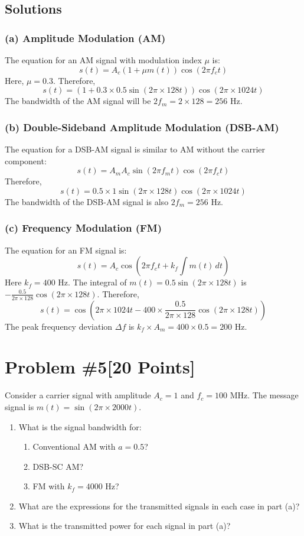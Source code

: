 \documentclass{article}
\begin{document}
\subsection*{Solutions}

\subsubsection*{(a) Amplitude Modulation (AM)}
The equation for an AM signal with modulation index \( \mu \) is:
\[
s(t) = A_c (1 + \mu m(t)) \cos(2\pi f_c t)
\]
Here, \( \mu = 0.3 \). Therefore,
\[
s(t) = (1 + 0.3 \times 0.5 \sin(2\pi \times 128 t)) \cos(2\pi \times 1024 t)
\]
The bandwidth of the AM signal will be \( 2f_m = 2 \times 128 = 256 \) Hz.

\subsubsection*{(b) Double-Sideband Amplitude Modulation (DSB-AM)}
The equation for a DSB-AM signal is similar to AM without the carrier component:
\[
s(t) = A_m A_c \sin(2\pi f_m t) \cos(2\pi f_c t)
\]
Therefore,
\[
s(t) = 0.5 \times 1 \sin(2\pi \times 128 t) \cos(2\pi \times 1024 t)
\]
The bandwidth of the DSB-AM signal is also \( 2f_m = 256 \) Hz.

\subsubsection*{(c) Frequency Modulation (FM)}
The equation for an FM signal is:
\[
s(t) = A_c \cos(2\pi f_c t + k_f \int m(t) \, dt)
\]
Here \( k_f = 400 \) Hz. The integral of \( m(t) = 0.5 \sin(2\pi \times 128 t) \) is \( -\frac{0.5}{2\pi \times 128} \cos(2\pi \times 128 t) \). Therefore,
\[
s(t) = \cos\left(2\pi \times 1024 t - 400 \times \frac{0.5}{2\pi \times 128} \cos(2\pi \times 128 t)\right)
\]
The peak frequency deviation \( \Delta f \) is \( k_f \times A_m = 400 \times 0.5 = 200 \) Hz.

\newpage
\section*{Problem \#5[20 Points]}

Consider a carrier signal with amplitude \( A_c = 1 \) and \( f_c = 100 \) MHz. The message signal is \( m(t) = \sin(2\pi \times 2000 t) \). 

\begin{enumerate}
    \item What is the signal bandwidth for:
    \begin{enumerate}
        \item Conventional AM with \( a = 0.5 \)?
        \item DSB-SC AM?
        \item FM with \( k_f = 4000 \) Hz?
    \end{enumerate}
    \item What are the expressions for the transmitted signals in each case in part (a)?
    \item What is the transmitted power for each signal in part (a)?
\end{enumerate}
\end{document}
